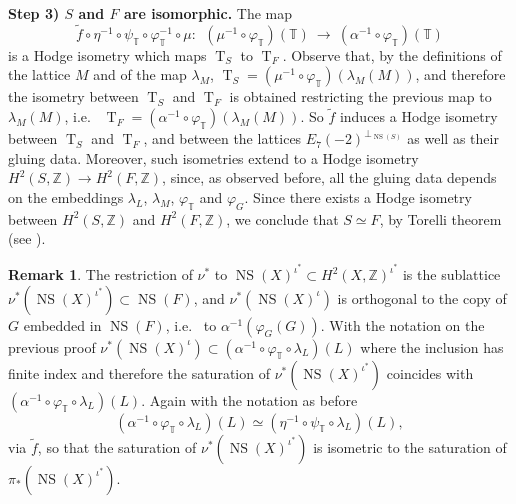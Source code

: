 \documentclass{amsart}
\theoremstyle{definition}
\newtheorem{rem}[thm]{Remark}
\numberwithin{equation}{section}
\numberwithin{equation}{section} \theoremstyle{definition}
\DeclareMathOperator{\NS}{NS}
\DeclareMathOperator{\T}{T}
\newcommand{\ra}{\rightarrow}
\newcommand\Z{\mathbb{Z}}
\begin{document}
{\bf Step 3) $S$ and $F$ are isomorphic.} The map \begin{equation}\label{eq:big HOdge isom}\widetilde{f}\circ \eta^{-1}\circ \psi_{\mathbb{T}}\circ \varphi^{-1}_{\mathbb{T}}\circ \mu:\ \ \left(\mu^{-1}\circ \varphi_{\mathbb{T}}\right)(\mathbb{T})\ \longrightarrow\ \left(\alpha^{-1}\circ\varphi_{\mathbb{T}}\right)(\mathbb{T})\end{equation}
is a Hodge isometry which maps $\T_S$ to $\T_F$. Observe that, by the definitions of the lattice $M$ and of the map $\lambda_M$,  $\T_S=\left(\mu^{-1}\circ \varphi_{\mathbb{T}}\right)(\lambda_M(M))$, and therefore the isometry between $\T_S$ and $\T_F$ is obtained restricting the previous map to $\lambda_M(M)$, i.e.~ $\T_F=\left(\alpha^{-1}\circ \varphi_{\mathbb{T}}\right)(\lambda_M(M))$. 
So $\widetilde{f}$ induces a Hodge isometry between $\T_S$ and $\T_F$,  and between the lattices $E_7(-2)^{\perp_{\NS(S)}}$ as well as their gluing data. Moreover, such isometries extend to a Hodge isometry $H^2(S,\Z)\ra H^2(F,\Z)$, since, as observed before, all the gluing data depends on the embeddings $\lambda_L$, $\lambda_M$, $\varphi_{\mathbb{T}}$ and $\varphi_G$. Since there exists a Hodge isometry between $H^2(S,\Z)$ and $H^2(F,\Z)$, we conclude that $S\simeq F$, by Torelli theorem (see \cite{PS}). \endproof
\begin{rem}\label{rem: nu* algebraic}{\rm The restriction of $\nu^*$ 
to $\NS(X)^{\iota^*}\subset H^2(X,\Z)^{\iota^*}$ is the sublattice $\nu^*(\NS(X)^{\iota^*})\subset \NS(F)$, and  $\nu^*(\NS(X)^{\iota})$ is orthogonal to the copy of $G$ embedded in $\NS(F)$, i.e.~ to $\alpha^{-1}(\varphi_G(G))$. With the notation on the previous proof $\nu^*(\NS(X)^{\iota})\subset \left(\alpha^{-1}\circ\varphi_{\mathbb{T}}\circ\lambda_L\right)(L)$ where the inclusion has  finite index and therefore the saturation of $\nu^*(\NS(X)^{\iota^*})$ coincides with $\left(\alpha^{-1}\circ\varphi_{\mathbb{T}}\circ\lambda_L\right)(L)$. Again with the notation as before $$\left(\alpha^{-1}\circ\varphi_{\mathbb{T}}\circ\lambda_L\right)(L)\simeq \left(\eta^{-1}\circ \psi_{\mathbb{T}}\circ\lambda_L\right)(L),$$ via $\widetilde{f}$, so that the saturation of $\nu^*(\NS(X)^{\iota^*})$ is isometric to the saturation of $\pi_*(\NS(X)^{\iota^*})$.}\end{rem}
\end{document}
